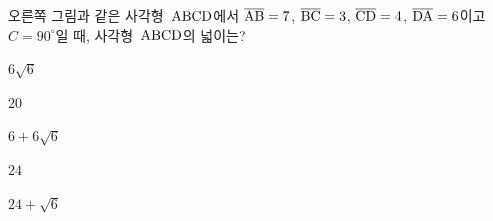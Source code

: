 \noindent\begin{minipage}[t]{0.58\linewidth}\vspace{0pt}\raggedright 오른쪽 그림과 같은 사각형~$\mathrm{ABCD}$에서 $\overline{\mathrm{AB}}=7$, $\overline{\mathrm{BC}}=3$, $\overline{\mathrm{CD}}=4$, $\overline{\mathrm{DA}}=6$이고 $C=90^\circ$일 때, 사각형~$\mathrm{ABCD}$의 넓이는?\end{minipage}\hfill\begin{minipage}[t]{0.4\linewidth}\vspace{0pt}\centering \resizebox{\ifdim\width>\linewidth\linewidth\else\width\fi}{!}{}\end{minipage}\par
\begin{choicesii}{\rule[-3ex]{0pt}{8ex}$6\sqrt{6}$}{\rule[-3ex]{0pt}{8ex}$20$}{\rule[-3ex]{0pt}{8ex}$6+6\sqrt{6}$}{\rule[-3ex]{0pt}{8ex}$24$}{\rule[-3ex]{0pt}{8ex}$24+\sqrt{6}$}\end{choicesii}
